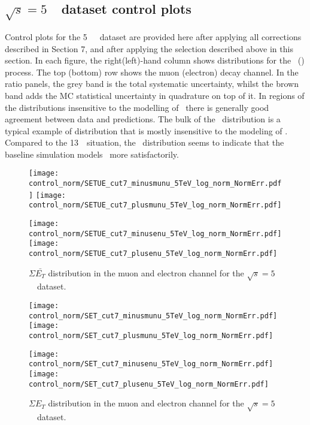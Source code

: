 \subsection{$\sqrt{s} = 5$~\TeV\ dataset control plots}
\label{subsec:controlplots5}
Control plots for the 5~\TeV\ \lowmu\ dataset are provided here after applying all corrections described in Section 7, and after applying the selection described above in this section. In each figure, the right(left)-hand column shows distributions for the \Wplus\ (\Wminus) process. The top (bottom) row shows the muon (electron) decay channel. In the ratio panels, the grey band is the total systematic uncertainty, whilst the brown band adds the MC statistical uncertainty in quadrature on top of it. In regions of the distributions insensitive to the modelling of \ptw\ there is generally good agreement between data and predictions. The bulk of the \mt\ distribution is a typical example of distribution that is mostly insensitive to the modeling of \ptw. Compared to the 13~\TeV\ situation, the \ut\ distribution seems to indicate that the baseline simulation models \ptw\ more satisfactorily.

\begin{figure}[h]
	\centering
	{\texttt{[image: control\_norm/SETUE\_cut7\_minusmunu\_5TeV\_log\_norm\_NormErr.pdf]}\label{f:SETUEmm5}}
	{\texttt{[image: control\_norm/SETUE\_cut7\_plusmunu\_5TeV\_log\_norm\_NormErr.pdf]}\label{f:SETUEpm5}}
	
	{\texttt{[image: control\_norm/SETUE\_cut7\_minusenu\_5TeV\_log\_norm\_NormErr.pdf]}\label{f:}}
	{\texttt{[image: control\_norm/SETUE\_cut7\_plusenu\_5TeV\_log\_norm\_NormErr.pdf]}\label{f:}}
	\caption{$\Sigma \bar{E_T}$ distribution in the muon and electron channel  for the $\sqrt{s} = 5$~\TeV\ dataset.}
\end{figure}
%

\begin{figure}[h]
	\centering
	{\texttt{[image: control\_norm/SET\_cut7\_minusmunu\_5TeV\_log\_norm\_NormErr.pdf]}\label{f:set5}}
	{\texttt{[image: control\_norm/SET\_cut7\_plusmunu\_5TeV\_log\_norm\_NormErr.pdf]}\label{f:setpl}}
	
	{\texttt{[image: control\_norm/SET\_cut7\_minusenu\_5TeV\_log\_norm\_NormErr.pdf]}\label{f:}}
	{\texttt{[image: control\_norm/SET\_cut7\_plusenu\_5TeV\_log\_norm\_NormErr.pdf]}\label{f:}}
	\caption{$\Sigma{E_T}$ distribution in the muon and electron channel  for the $\sqrt{s} = 5$~\TeV\ dataset.}
\end{figure}
\newpage



